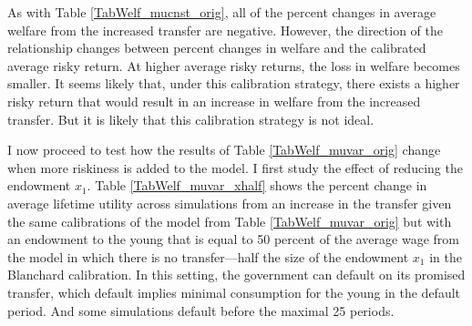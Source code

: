\documentclass[letterpaper,12pt]{article}
\theoremstyle{definition}
\begin{document}
  As with Table \ref{TabWelf_mucnst_orig}, all of the percent changes in average welfare from the increased transfer are negative. However, the direction of the relationship changes between percent changes in welfare and the calibrated average risky return. At higher average risky returns, the loss in welfare becomes smaller. It seems likely that, under this calibration strategy, there exists a higher risky return that would result in an increase in welfare from the increased transfer. But it is likely that this calibration strategy is not ideal.

  I now proceed to test how the results of Table \ref{TabWelf_muvar_orig} change when more riskiness is added to the model. I first study the effect of reducing the endowment $x_1$. Table \ref{TabWelf_muvar_xhalf} shows the percent change in average lifetime utility across simulations from an increase in the transfer given the same calibrations of the model from Table \ref{TabWelf_muvar_orig} but with an endowment to the young that is equal to 50 percent of the average wage from the model in which there is no transfer---half the size of the endowment $x_1$ in the Blanchard calibration. In this setting, the government can default on its promised transfer, which default implies minimal consumption for the young in the default period. And some simulations default before the maximal 25 periods.
\end{document}
